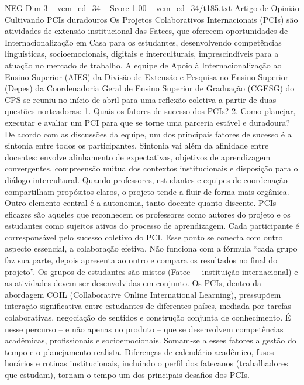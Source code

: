 \begin{textsample}{NEG Dim 3 – vem\_ed\_34 – Score 1.00 – vem\_ed\_34/t185.txt}  \label{ex:f3_neg_047}
Artigo de Opinião Cultivando PCIs duradouros Os Projetos Colaborativos Internacionais (PCIs) são atividades de extensão institucional das Fatecs, que oferecem oportunidades de Internacionalização em Casa para os estudantes, desenvolvendo competências linguísticas, socioemocionais, digitais e interculturais, imprescindíveis para a atuação no mercado de trabalho.
A equipe de Apoio à Internacionalização ao Ensino Superior (AIES) da Divisão de Extensão e Pesquisa no Ensino Superior (Depes) da Coordenadoria Geral de Ensino Superior de Graduação (CGESG) do CPS se reuniu no início de abril para uma reflexão coletiva a partir de duas questões norteadoras: 1.
Quais os fatores de sucesso dos PCIs? 2.
Como planejar, executar e avaliar um PCI para que se torne uma parceria estável e duradoura?
De acordo com as discussões da equipe, um dos principais fatores de sucesso é a sintonia entre todos os participantes.
Sintonia vai além da afinidade entre docentes: envolve alinhamento de expectativas, objetivos de aprendizagem convergentes, compreensão mútua dos contextos institucionais e disposição para o diálogo intercultural.
Quando professores, estudantes e equipes de coordenação compartilham propósitos claros, o projeto tende a fluir de forma mais orgânica.
Outro elemento central é a autonomia, tanto docente quanto discente.
PCIs eficazes são aqueles que reconhecem os professores como autores do projeto e os estudantes como sujeitos ativos do processo de aprendizagem.
Cada participante é corresponsável pelo sucesso coletivo do PCI.
Esse ponto se conecta com outro aspecto essencial, a colaboração efetiva.
Não funciona com a fórmula “cada grupo faz sua parte, depois apresenta ao outro e compara os resultados no final do projeto”.
Os grupos de estudantes são mistos (Fatec + instituição internacional) e as atividades devem ser desenvolvidas em conjunto.
Os PCIs, dentro da abordagem COIL (Collaborative Online International Learning), pressupõem interação significativa entre estudantes de diferentes países, mediada por tarefas colaborativas, negociação de sentidos e construção conjunta de conhecimento.
É nesse percurso – e não apenas no produto – que se desenvolvem competências acadêmicas, profissionais e socioemocionais.
Somam-se a esses fatores a gestão do tempo e o planejamento realista.
Diferenças de calendário acadêmico, fusos horários e rotinas institucionais, incluindo o perfil dos fatecanos (trabalhadores que estudam), tornam o tempo um dos principais desafios dos PCIs.

\end{textsample}
